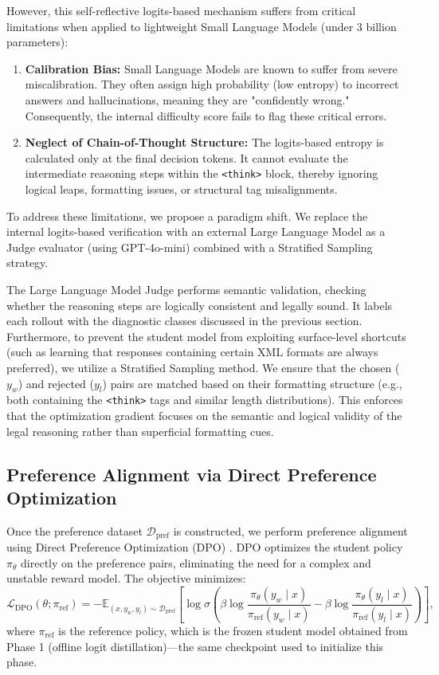 However, this self-reflective logits-based mechanism suffers from critical limitations when applied to lightweight Small Language Models (under 3 billion parameters):
\begin{enumerate}
    \item \textbf{Calibration Bias:} Small Language Models are known to suffer from severe miscalibration. They often assign high probability (low entropy) to incorrect answers and hallucinations, meaning they are "confidently wrong." Consequently, the internal difficulty score fails to flag these critical errors.
    \item \textbf{Neglect of Chain-of-Thought Structure:} The logits-based entropy is calculated only at the final decision tokens. It cannot evaluate the intermediate reasoning steps within the \texttt{<think>} block, thereby ignoring logical leaps, formatting issues, or structural tag misalignments.
\end{enumerate}
To address these limitations, we propose a paradigm shift. We replace the internal logits-based verification with an external Large Language Model as a Judge evaluator (using GPT-4o-mini) combined with a Stratified Sampling strategy.

The Large Language Model Judge performs semantic validation, checking whether the reasoning steps are logically consistent and legally sound. It labels each rollout with the diagnostic classes discussed in the previous section. Furthermore, to prevent the student model from exploiting surface-level shortcuts (such as learning that responses containing certain XML formats are always preferred), we utilize a Stratified Sampling method. We ensure that the chosen ($y_w$) and rejected ($y_l$) pairs are matched based on their formatting structure (e.g., both containing the \texttt{<think>} tags and similar length distributions). This enforces that the optimization gradient focuses on the semantic and logical validity of the legal reasoning rather than superficial formatting cues.

\subsection{Preference Alignment via Direct Preference Optimization}

Once the preference dataset $\mathcal{D}_{\text{pref}}$ is constructed, we perform preference alignment using Direct Preference Optimization (DPO) \parencite{rafailov2024directpreferenceoptimizationlanguage}. DPO optimizes the student policy $\pi_\theta$ directly on the preference pairs, eliminating the need for a complex and unstable reward model. The objective minimizes:
\begin{equation}
    \mathcal{L}_{\text{DPO}}(\theta; \pi_{\text{ref}}) = -\mathbb{E}_{(x, y_w, y_l) \sim \mathcal{D}_{\text{pref}}} \left[ \log \sigma \left( \beta \log \frac{\pi_\theta(y_w \mid x)}{\pi_{\text{ref}}(y_w \mid x)} - \beta \log \frac{\pi_\theta(y_l \mid x)}{\pi_{\text{ref}}(y_l \mid x)} \right) \right],
\end{equation}
where $\pi_{\text{ref}}$ is the reference policy, which is the frozen student model obtained from Phase 1 (offline logit distillation)---the same checkpoint used to initialize this phase.

